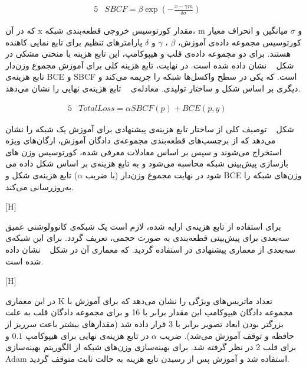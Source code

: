 \begin{alignat}{5}
	& SBCF = \beta \exp(-\frac{x-\gamma m}{\delta \sigma}) \label{sbcf} && 
\end{alignat}

که در آن x مقدار کورتوسیس خروجی قطعه‌بندی شبکه، m و $\sigma$ میانگین و انحراف معیار کورتوسیس مجموعه داده‌ی آموزش، $\beta$ ، $\gamma$ و $\delta$ پارامترهای تنظیم برای تابع نمایی کاهنده هستند. برای دو مجموعه داده‌ی قلب و هیپوکامپ، این تابع هزینه با منحنی مشکی در شکل ~ نشان داده شده است. در نهایت، تابع هزینه کلی برای آموزش مجموع وزن‌دار تابع هزینه‌ی BCE و SBCF است. که یکی در سطح واکسل‌ها شبکه را جریمه می‌کند و دیگری بر اساس شکل و ساختار تولیدی. معادله‌ی ~ تابع هزینه‌ی نهایی را نشان می‌دهد.

\begin{alignat}{5}
	& TotalLoss = \alpha SBCF(p) + BCE(p, y) \label{sbcfbce} && 
\end{alignat}
   
شکل ~ توصیف کلی از ساختار تابع هزینه‌ی پیشنهادی برای آموزش یک شبکه را نشان می‌دهد که از برچسب‌های قطعه‌بندی مجموعه‌ی دادگان آموزش، ارگان‌های ویژه استخراج می‌شوند و سپس بر اساس معادلات معرفی شده، کورتوسیس وزن های بازسازی پیش‌بینی شبکه محاسبه می‌شود و به تابع هزینه‌ی بر اساس شکل داده می شود در نهایت مجموع وزن‌دار (با ضریب $\alpha$) تابع هزینه‌ی شکل و BCE وزن‌های شبکه را به‌روزرسانی می‌کند.

[H]


برای استفاده از تابع هزینه‌ی ارایه شده، لازم است یک شبکه‌ی کانوولوشنی عمیق سه‌بعدی برای پیش‌بینی قطعه‌بندی به صورت حجمی، تعریف گردد. برای این شبکه‌ی سه‌بعدی از معماری پیشنهادی در  استفاده گردید. که معماری آن در شکل ~ نشان داده شده است.

[H]

در این معماری K تعداد ماتریس‌های ویژگی را نشان می‌دهد که برای آموزش با مجموعه دادگان هیپوکامپ این مقدار برابر با 16 و برای مجموعه دادگان قلب به علت بزرگتر بودن ابعاد تصویر برابر با 3 قرار داده شد (مقدارهای بیشتر باعث سرریز از حافظه و توقف آموزش می‌شد). ضریب $\alpha$ در تابع هزینه‌ی نهایی برای هیپوکامپ $0.1$ و برای قلب 2 در نظر گرفته شد. برای بهینه‌سازی وزن‌های شبکه از الگوریتم بهینه‌سازی Adam استفاده شد و آموزش پس از رسیدن تابع هزینه به حالت ثابت متوقف گردید.

